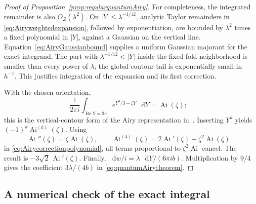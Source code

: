 \documentclass[11pt,a4paper]{article}
\numberwithin{equation}{section}
\theoremstyle{definition}
\theoremstyle{remark}
\newcommand{\dd}{\mathop{}\!\mathrm d}
\begin{document}
\begin{proof}[Proof of Proposition~\ref{prop:regularquantumAiry}]
For completeness, the integrated remainder is also
$O_Z(\lambda^2)$. On
$|Y|\le\lambda^{-1/12}$, analytic Taylor remainders in
\eqref{eq:Airyweightedexpansion}, followed by exponentiation,
are bounded by $\lambda^2$ times a fixed polynomial in
$|Y|$, against a Gaussian on the vertical line.
Equation~\eqref{eq:AiryGaussianbound} supplies a uniform
Gaussian majorant for the exact integrand. The part with
$\lambda^{-1/12}<|Y|$ inside the fixed fold neighborhood
is smaller than every power of $\lambda$; the global contour
tail is exponentially small in $h^{-1}$. This justifies
integration of the expansion and its first correction.

With the chosen orientation,
\[
 \frac1{2\pi i}\int_{\operatorname{Re}Y=3c}
       e^{Y^3/3-\zeta Y}\,\dd Y=\operatorname{Ai}(\zeta);
\]
this is the vertical-contour form of the Airy representation
in~\cite[Section~9.5]{DLMF}. Inserting $Y^k$ yields
$(-1)^k\operatorname{Ai}^{(k)}(\zeta)$.
Using
\[
 \operatorname{Ai}''(\zeta)=\zeta\operatorname{Ai}(\zeta),
 \qquad
 \operatorname{Ai}^{(4)}(\zeta)
       =2\operatorname{Ai}'(\zeta)
          +\zeta^2\operatorname{Ai}(\zeta)
\]
in \eqref{eq:Airycorrectionpolynomial}, all terms proportional
to $\zeta^2\operatorname{Ai}$ cancel. The result is
$-3\sqrt2\,\operatorname{Ai}'(\zeta)$.
Finally,
$\dd w/i=\lambda\,\dd Y/(6\pi i b)$.
Multiplication by $9/4$ gives the coefficient
$3\lambda/(4b)$ in \eqref{eq:quantumAirytheorem}.
\end{proof}

\subsection{A numerical check of the exact integral}
\end{document}
